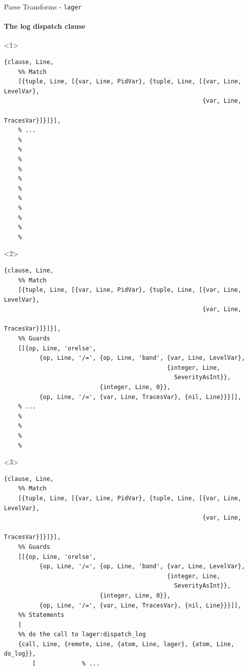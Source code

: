 \documentclass[c]{beamer}
\begin{document}
\begin{frame}[fragile,t]{Parse Transforms - \texttt{lager}}
  \framesubtitle{The log dispatch clause}
    \begin{onlyenv}<1>
\begin{lstlisting}
{clause, Line,
    %% Match
    [{tuple, Line, [{var, Line, PidVar}, {tuple, Line, [{var, Line, LevelVar},
                                                        {var, Line,
                                                          TracesVar}]}]}],
    % ...
    %
    %
    %
    %
    %
    %
    %
    %
    %
    %
    %
\end{lstlisting}
  \end{onlyenv}
  \begin{onlyenv}<2>
\begin{lstlisting}
{clause, Line,
    %% Match
    [{tuple, Line, [{var, Line, PidVar}, {tuple, Line, [{var, Line, LevelVar},
                                                        {var, Line,
                                                          TracesVar}]}]}],
    %% Guards
    [[{op, Line, 'orelse',
          {op, Line, '/=', {op, Line, 'band', {var, Line, LevelVar},
                                              {integer, Line,
                                                SeverityAsInt}},
                           {integer, Line, 0}},
          {op, Line, '/=', {var, Line, TracesVar}, {nil, Line}}}]],
    % ...
    %
    %
    %
    %
\end{lstlisting}
  \end{onlyenv}
  \begin{onlyenv}<3>
\begin{lstlisting}
{clause, Line,
    %% Match
    [{tuple, Line, [{var, Line, PidVar}, {tuple, Line, [{var, Line, LevelVar},
                                                        {var, Line,
                                                          TracesVar}]}]}],
    %% Guards
    [[{op, Line, 'orelse',
          {op, Line, '/=', {op, Line, 'band', {var, Line, LevelVar},
                                              {integer, Line,
                                                SeverityAsInt}},
                           {integer, Line, 0}},
          {op, Line, '/=', {var, Line, TracesVar}, {nil, Line}}}]],
    %% Statements
    [
    %% do the call to lager:dispatch_log
    {call, Line, {remote, Line, {atom, Line, lager}, {atom, Line, do_log}},
        [             % ...
\end{lstlisting}
  \end{onlyenv}
\end{frame}
\end{document}

